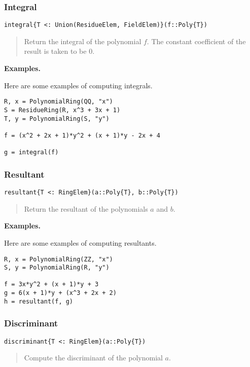 \documentclass[a4paper,10pt]{article}
\newcommand{\desc}[1]{\vspace{-3mm}\begin{quote}#1\end{quote}}
\begin{document}
\subsubsection{Integral}

\begin{lstlisting}
integral{T <: Union(ResidueElem, FieldElem)}(f::Poly{T})
\end{lstlisting}

\desc{Return the integral of the polynomial $f$. The constant coefficient of
the result is taken to be $0$.}

\textbf{Examples.}

Here are some examples of computing integrals.

\begin{lstlisting}
R, x = PolynomialRing(QQ, "x")
S = ResidueRing(R, x^3 + 3x + 1)
T, y = PolynomialRing(S, "y")

f = (x^2 + 2x + 1)*y^2 + (x + 1)*y - 2x + 4

g = integral(f)   
\end{lstlisting}

\subsubsection{Resultant}

\begin{lstlisting}
resultant{T <: RingElem}(a::Poly{T}, b::Poly{T})
\end{lstlisting}

\desc{Return the resultant of the polynomials $a$ and $b$.}

\textbf{Examples.}

Here are some examples of computing resultants.

\begin{lstlisting}
R, x = PolynomialRing(ZZ, "x")
S, y = PolynomialRing(R, "y")

f = 3x*y^2 + (x + 1)*y + 3
g = 6(x + 1)*y + (x^3 + 2x + 2)
h = resultant(f, g)
\end{lstlisting}

\subsubsection{Discriminant}

\begin{lstlisting}
discriminant{T <: RingElem}(a::Poly{T})
\end{lstlisting}

\desc{Compute the discriminant of the polynomial $a$.}
\end{document}
